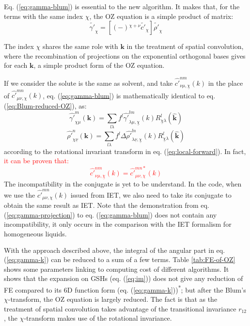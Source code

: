Eq. (\ref{eq:gamma-blum}) is essential to the new algorithm. It makes
that, for the terms with the same index $\chi$, the \acs{OZ} equation
is a simple product of matrix:
\begin{equation}
\tilde{\gamma'}_{\chi}=\left[\left(-\right){}^{\chi+\nu}\tilde{c'}_{\chi}\right]\tilde{\rho'}_{\chi}
\end{equation}

The index $\chi$ shares the same role with $\mathbf{k}$ in the treatment
of spatial convolution, where the recombination of projections on
the exponential orthogonal bases gives for each $\mathbf{k}$, a simple
product form of the \acs{OZ} equation.

If we consider the solute is the same as solvent, and take $\hat{c'}_{\nu\mu,\underline{\chi}}^{nm}(k)$
in the place of $\hat{c'}_{\mu\nu,\chi}^{mn}(k)$, eq. (\ref{eq:gamma-blum})
is mathematically identical to eq. (\ref{eq:Blum-reduced-OZ}), as:
\begin{equation}
\hat{\gamma'}_{\chi\mu}^{m}(\mathbf{k})=\sum_{l\lambda}f^{l}\hat{\gamma'}_{\lambda\mu,\underline{\chi}}^{lm}(k)R_{\underline{\chi}\lambda}^{l}(\hat{\mathbf{k}})
\end{equation}
\begin{equation}
\hat{\rho'}_{\chi\underline{\nu}}^{n}(\mathbf{k})=\sum_{l\lambda}f^{l}\Delta\hat{\rho'}_{\lambda\underline{\nu},\underline{\chi}}^{ln}(k)R_{\underline{\chi}\lambda}^{l}(\hat{\mathbf{k}})
\end{equation}
according to the rotational invariant transform in eq. (\ref{eq:local-forward}).
In fact, \textcolor{red}{it can be proven that:
\begin{equation}
\hat{c'}_{\nu\mu,\underline{\chi}}^{nm}(k)=\hat{c'}_{\mu\nu,\chi}^{mn*}(k)
\end{equation}
}The incompatibility in the conjugate is yet to be understand. In
the code, when we use the $\hat{c'}_{\mu\nu,\chi}^{mn}(k)$ issued
from \acs{IET}, we also need to take its conjugate to obtain the
same result as \acs{IET}. Note that the demonstration from eq. (\ref{eq:gamma-projection})
to eq. (\ref{eq:gamma-blum}) does not contain any incompatibility,
it only occurs in the comparison with the \acs{IET} formalism for
homogeneous liquids.

With the approach described above, the integral of the angular part
in eq. (\ref{eq:gamma-k}) can be reduced to a sum of a few terms.
Table \ref{tab:FE-of-OZ} shows some parameters linking to computing
cost of different algorithms. It shows that the expansion on \acs{GSH}s (eq. (\ref{eq:im})) does
not give any reduction of \acs{FE} compared to its 6D function form
(eq. (\ref{eq:gamma-k}))\textsuperscript{{*}}; but after the Blum's
$\chi$-transform, the \acs{OZ} equation is largely reduced. The
fact is that as the treatment of spatial convolution takes advantage
of the transitional invariance $r_{12}$, the $\chi$-transform makes
use of the rotational invariance.

